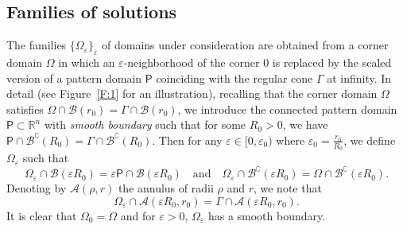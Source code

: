 \documentclass[titlepage,12pt]{amsart}
\theoremstyle{definition}
\theoremstyle{remark}
\numberwithin{equation}{section}
\newcommand\R{{\mathbb R}}
\newcommand{\sA}{{\mathscr A}}
\newcommand{\sB}{{\mathscr B}}
\newcommand{\rP}{{\mathsf{P}}}
\begin{document}
\subsection{Families of solutions}
The families $\big\{\Omega_\varepsilon\big\}_{\varepsilon}$ of domains under consideration are
 obtained from a corner domain $\Omega$ in which an $\varepsilon$-neighborhood of the corner $0$ is replaced by the scaled version of a pattern domain $\rP$ coinciding with the regular cone $\Gamma$ at infinity. In detail (see Figure~\ref{F:1} for an illustration), recalling that the corner domain $\Omega$ satisfies $\Omega\cap\sB(r_0) = \Gamma\cap\sB(r_0)$, we introduce the connected pattern domain $\rP\subset\R^n$ with {\em smooth boundary} such that for some $R_0>0$, we have $\rP\cap\sB^\complement(R_0) = \Gamma\cap\sB^\complement(R_0)$.
Then for any $\varepsilon\in[0,\varepsilon_0)$ where $\varepsilon_0=\frac{r_0}{R_0}$, we define $\Omega_\varepsilon$ such that
\[
   \Omega_\varepsilon\cap\sB(\varepsilon R_0) = \varepsilon\rP\cap\sB(\varepsilon R_0)
   \quad\mbox{and}\quad
   \Omega_\varepsilon\cap\sB^\complement(\varepsilon R_0) = 
   \Omega\cap\sB^\complement(\varepsilon R_0).
\]
Denoting by $\sA(\rho,r)$ the annulus of radii $\rho$ and $r$, we note that
\[
   \Omega_\varepsilon\cap\sA(\varepsilon R_0,r_0) = \Gamma\cap\sA(\varepsilon R_0,r_0).
\]
It is clear that  $\Omega_0=\Omega$ and for $\varepsilon>0$, $\Omega_\varepsilon$ has a smooth boundary.
\end{document}
